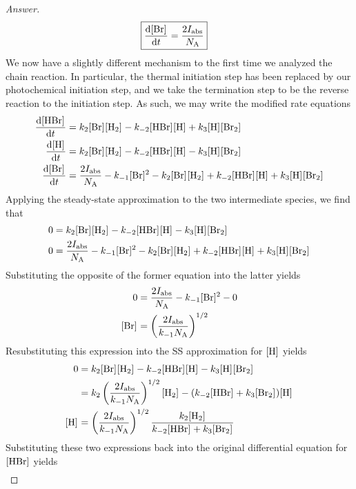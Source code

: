 \documentclass[../psets.tex]{subfiles}
\begin{document}
\begin{enumerate}[label={\textbf{29-\arabic*.}},leftmargin=3.5em]
\begin{proof}[Answer]
\begin{align*}
            \Aboxed{\dv{\cnc{Br}}{t} &= \frac{2I_\text{abs}}{\NA}}
        \end{align*}
        We now have a slightly different mechanism to the first time we analyzed the  chain reaction. In particular, the thermal initiation step has been replaced by our photochemical initiation step, and we take the termination step to be the reverse reaction to the initiation step. As such, we may write the modified rate equations
        \begin{align*}
            \dv{\cnc{HBr}}{t} &= k_2\cnc{Br}\cnc{H2}-k_{-2}\cnc{HBr}\cnc{H}+k_3\cnc{H}\cnc{Br2}\\
            \dv{\cnc{H}}{t} &= k_2\cnc{Br}\cnc{H2}-k_{-2}\cnc{HBr}\cnc{H}-k_3\cnc{H}\cnc{Br2}\\
            \dv{\cnc{Br}}{t} &= \frac{2I_\text{abs}}{\NA}-k_{-1}\cnc{Br}^2-k_2\cnc{Br}\cnc{H2}+k_{-2}\cnc{HBr}\cnc{H}+k_3\cnc{H}\cnc{Br2}
        \end{align*}
        Applying the steady-state approximation to the two intermediate species, we find that
        \begin{align*}
            0 &= k_2\cnc{Br}\cnc{H2}-k_{-2}\cnc{HBr}\cnc{H}-k_3\cnc{H}\cnc{Br2}\\
            0 &= \frac{2I_\text{abs}}{\NA}-k_{-1}\cnc{Br}^2-k_2\cnc{Br}\cnc{H2}+k_{-2}\cnc{HBr}\cnc{H}+k_3\cnc{H}\cnc{Br2}
        \end{align*}
        Substituting the opposite of the former equation into the latter yields
        \begin{align*}
            0 &= \frac{2I_\text{abs}}{\NA}-k_{-1}\cnc{Br}^2-0\\
            \cnc{Br} &= \left( \frac{2I_\text{abs}}{k_{-1}\NA} \right)^{1/2}
        \end{align*}
        Resubstituting this expression into the SS approximation for $\cnc{H}$ yields
        \begin{align*}
            0 &= k_2\cnc{Br}\cnc{H2}-k_{-2}\cnc{HBr}\cnc{H}-k_3\cnc{H}\cnc{Br2}\\
            &= k_2\left( \frac{2I_\text{abs}}{k_{-1}\NA} \right)^{1/2}\cnc{H2}-(k_{-2}\cnc{HBr}+k_3\cnc{Br2})\cnc{H}\\
            \cnc{H} &= \left( \frac{2I_\text{abs}}{k_{-1}\NA} \right)^{1/2}\frac{k_2\cnc{H2}}{k_{-2}\cnc{HBr}+k_3\cnc{Br2}}
        \end{align*}
        Substituting these two expressions back into the original differential equation for $\cnc{HBr}$ yields
        \begin{align*}

\end{align*}
\end{proof}
\end{enumerate}
\end{document}
